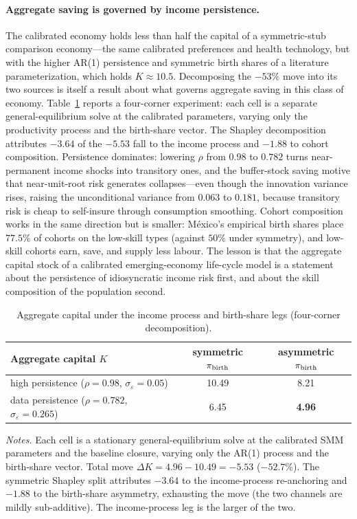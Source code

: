\documentclass[12pt,a4paper]{article}
\begin{document}
\paragraph{Aggregate saving is governed by income persistence.}
The calibrated economy holds less than half the capital of a symmetric-stub comparison economy---the same calibrated preferences and health technology, but with the higher AR(1) persistence and symmetric birth shares of a literature parameterization, which holds $K\approx 10.5$. Decomposing the $-53\%$ move into its two sources is itself a result about what governs aggregate saving in this class of economy. Table~\ref{tab:k_decomp} reports a four-corner experiment: each cell is a separate general-equilibrium solve at the calibrated parameters, varying only the productivity process and the birth-share vector. The Shapley decomposition attributes $-3.64$ of the $-5.53$ fall to the income process and $-1.88$ to cohort composition. Persistence dominates: lowering $\rho$ from $0.98$ to $0.782$ turns near-permanent income shocks into transitory ones, and the buffer-stock saving motive that near-unit-root risk generates collapses---even though the innovation variance rises, raising the unconditional variance from $0.063$ to $0.181$, because transitory risk is cheap to self-insure through consumption smoothing. Cohort composition works in the same direction but is smaller: M\'exico's empirical birth shares place $77.5\%$ of cohorts on the low-skill types (against $50\%$ under symmetry), and low-skill cohorts earn, save, and supply less labour. The lesson is that the aggregate capital stock of a calibrated emerging-economy life-cycle model is a statement about the persistence of idiosyncratic income risk first, and about the skill composition of the population second.

\begin{table}[H]
\centering
\caption{Aggregate capital under the income process and birth-share legs (four-corner decomposition).}
\label{tab:k_decomp}
\begin{tabular}{lcc}
\toprule
Aggregate capital $K$ & symmetric $\pi_{\rm birth}$ & asymmetric $\pi_{\rm birth}$ \\
\midrule
high persistence ($\rho=0.98$, $\sigma_\varepsilon=0.05$)   & 10.49 & 8.21 \\
data persistence ($\rho=0.782$, $\sigma_\varepsilon=0.265$) & 6.45  & \textbf{4.96} \\
\bottomrule
\end{tabular}

\vspace{0.5em}
\begin{minipage}{0.92\textwidth}
\footnotesize \textit{Notes.} Each cell is a stationary general-equilibrium solve at the calibrated SMM parameters and the baseline closure, varying only the AR(1) process and the birth-share vector. Total move $\Delta K = 4.96-10.49=-5.53$ ($-52.7\%$). The symmetric Shapley split attributes $-3.64$ to the income-process re-anchoring and $-1.88$ to the birth-share asymmetry, exhausting the move (the two channels are mildly sub-additive). The income-process leg is the larger of the two.
\end{minipage}
\end{table}
\end{document}
